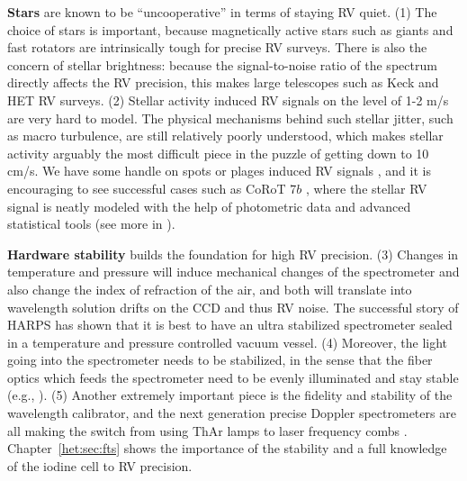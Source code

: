 {\bf Stars} are known to be ``uncooperative'' in terms of staying RV
quiet. (1) The choice of stars is important, because magnetically
active stars such as giants and fast rotators are intrinsically tough
for precise RV surveys. There is also the concern of stellar
brightness: because the signal-to-noise ratio of the spectrum directly
affects the RV precision, this makes large telescopes such as Keck
and HET  RV surveys. (2) Stellar activity
induced RV signals on the level of 1-2 m/s are very hard to model. The
physical mechanisms behind such stellar jitter, such as macro
turbulence, are still relatively poorly understood, which makes stellar
activity arguably the most difficult piece in the puzzle of getting
down to 10 cm/s. We have some handle on spots or plages induced RV
signals \citep{2014ApJ...796..132D}, and it is encouraging to see
successful cases such as CoRoT 7$b$ \citep{2014MNRAS.443.2517H}, where
the stellar RV signal is neatly modeled with the help of photometric
data and advanced statistical tools (see more in
\citealt{2016MNRAS.tmp..650V}).

{\bf Hardware stability} builds the foundation for high RV
precision. (3) Changes in temperature and pressure will induce
mechanical changes of the spectrometer and also change the index of
refraction of the air, and both will translate into wavelength
solution drifts on the CCD and thus RV noise. The successful story of
HARPS has shown that it is best to have an ultra stabilized
spectrometer sealed in a temperature and pressure controlled vacuum
vessel. (4) Moreover, the light going into the spectrometer needs to
be stabilized, in the sense that the fiber optics which feeds the
spectrometer need to be evenly illuminated and stay stable (e.g.,
\citealt{2015ApJ...806...61H}). (5) Another extremely important piece
is the fidelity and stability of the wavelength calibrator, and the
next generation precise Doppler spectrometers are all making the
switch from using ThAr lamps to laser frequency combs
\citep{2008Natur.452..610L,2016NatCo...710436Y}. Chapter~\ref{het:sec:fts}
shows the importance of the stability and a full knowledge of the
iodine cell to RV precision.

